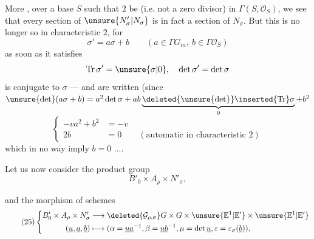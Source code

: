 More , over a base $S$ such that
$2$  be  
(i.e. not a zero divisor) in $\Gamma(S,\mathcal O_S)$, we see that every section of
$\unsure{N'_\sigma|N_\sigma}$ is in fact a section of $N_\sigma$.
But this is no longer so in characteristic $2$, for
\[
\sigma'=a\sigma+b\qquad(a\in\Gamma G_m,\ b\in\Gamma\mathcal O_S)
\]
as soon as it satisfies
\[
\operatorname{Tr}\sigma'=\unsure{\sigma|0},\quad\det\sigma'=\det\sigma
\]
is conjugate  to $\sigma$ --- and
 
are written (since
$\unsure{\det}(a\sigma+b)=a^2\det\sigma+
 ab\underbrace{\deleted{\unsure{\det}}\inserted{\operatorname{Tr}}\sigma}_{0}+b^2$
\[
\left\{\begin{aligned}
-va^2+b^2&=-v\\
2b&=0\qquad(\text{automatic in characteristic }2)
\end{aligned}\right.
\]
which in no way imply $b=0$ ....

 Let us now consider the product group
\[
B'_0\times A_\rho\times N'_\sigma,
\]


and the morphism of schemes
\[
\tag{25}
\left\{\begin{aligned}
B'_0\times A_\rho\times N'_\sigma
&\longrightarrow \deleted{\mathcal G_{\rho,\sigma}}
 G\times G\times\unsure{\mathbb E^1|\mathbb E'}\times\unsure{\mathbb E^1|\mathbb E'}\\
(\underline u,\underline a,\underline b)
&\longmapsto
(\alpha=\underline u\underline a^{-1},\beta=\underline u\underline b^{-1},
\mu=\det\underline u,\varepsilon=\varepsilon_\sigma(\underline b)),
\end{aligned}\right.
\]

